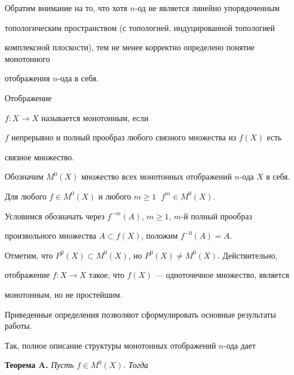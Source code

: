 Обратим внимание на то, что хотя $n$-од не является линейно упорядоченным


топологическим пространством (с топологией, индуцированной топологией


комплексной плоскости), тем не менее корректно определено понятие монотонного


отображения $n$-ода в себя.





\begin{defn} Отображение


$f:X\to X$ называется монотонным, если


$f$ непрерывно и полный прообраз любого связного множества из $f(X)$ есть


связное множество.


\end{defn}





Обозначим $M^0(X)$ множество всех монотонных отображений $n$-ода $X$ в себя.


Для любого $f\in M^0(X)$ и любого $m\ge 1\;$ $f^m\in M^0(X)$.





Условимся обозначать через $f^{-m}(A)$, $m\ge 1$, $m$-й полный прообраз


произвольного множества $A\subset f(X)$, положим $f^{-0}(A)=A$.





Отметим, что $P^0(X)\subset M^0(X)$, но $P^0(X)\ne M^0(X)$. Действительно,


отображение $f:X\to X$ такое, что $f(X)$ --- одноточечное множество, является


монотонным, но не простейшим.





Приведенные определения позволяют сформулировать основные результаты работы.


Так, полное описание структуры монотонных отображений $n$-ода дает


\medskip





{\bf Теорема A.} {\it Пусть $f\in M^0(X)$. Тогда}


